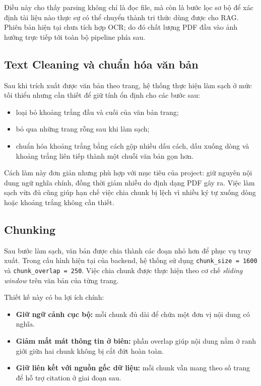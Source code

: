 \documentclass[12pt]{ai_conquer2026}
\begin{document}
Điều này cho thấy parsing không chỉ là đọc file, mà còn là bước lọc sơ bộ để xác định tài liệu nào thực sự có thể chuyển thành tri thức dùng được cho RAG. Phiên bản hiện tại chưa tích hợp OCR; do đó chất lượng PDF đầu vào ảnh hưởng trực tiếp tới toàn bộ pipeline phía sau.

\subsection{Text Cleaning và chuẩn hóa văn bản}

Sau khi trích xuất được văn bản theo trang, hệ thống thực hiện làm sạch ở mức tối thiểu nhưng cần thiết để giữ tính ổn định cho các bước sau:

\begin{itemize}
    \item loại bỏ khoảng trắng đầu và cuối của văn bản trang;
    \item bỏ qua những trang rỗng sau khi làm sạch;
    \item chuẩn hóa khoảng trắng bằng cách gộp nhiều dấu cách, dấu xuống dòng và khoảng trắng liên tiếp thành một chuỗi văn bản gọn hơn.
\end{itemize}

Cách làm này đơn giản nhưng phù hợp với mục tiêu của project: giữ nguyên nội dung ngữ nghĩa chính, đồng thời giảm nhiễu do định dạng PDF gây ra. Việc làm sạch vừa đủ cũng giúp hạn chế việc chia chunk bị lệch vì nhiều ký tự xuống dòng hoặc khoảng trắng không cần thiết.

\subsection{Chunking}

Sau bước làm sạch, văn bản được chia thành các đoạn nhỏ hơn để phục vụ truy xuất. Trong cấu hình hiện tại của backend, hệ thống sử dụng \texttt{chunk\_size = 1600} và \texttt{chunk\_overlap = 250}. Việc chia chunk được thực hiện theo cơ chế \textit{sliding window} trên văn bản của từng trang.

Thiết kế này có ba lợi ích chính:
\begin{itemize}
    \item \textbf{Giữ ngữ cảnh cục bộ:} mỗi chunk đủ dài để chứa một đơn vị nội dung có nghĩa.
    \item \textbf{Giảm mất mát thông tin ở biên:} phần overlap giúp nội dung nằm ở ranh giới giữa hai chunk không bị cắt đứt hoàn toàn.
    \item \textbf{Giữ liên kết với nguồn gốc dữ liệu:} mỗi chunk vẫn mang theo số trang để hỗ trợ citation ở giai đoạn sau.
\end{itemize}
\end{document}
